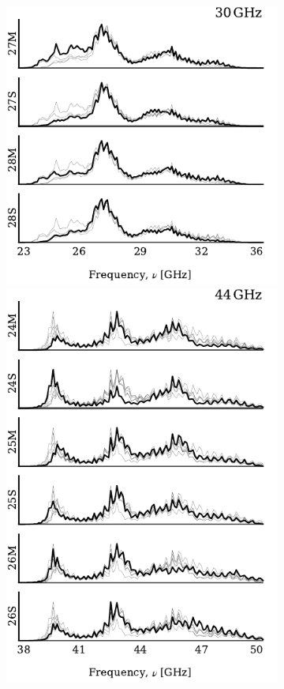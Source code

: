 \documentclass[twocolumn]{aa}
\newcommand{\?}[1]{\textcolor{red}{{\bf [#1]}}}
\begin{document}
\begin{figure}[p]
  \center
  \begin{subfigure}{0.45\linewidth}
    \includegraphics[width=\linewidth]{figs/NEWbps_30GHz.pdf}\vspace*{2.1cm}
    \includegraphics[width=\linewidth]{figs/NEWbps_44GHz.pdf}

\end{subfigure}
\end{figure}
\end{document}
